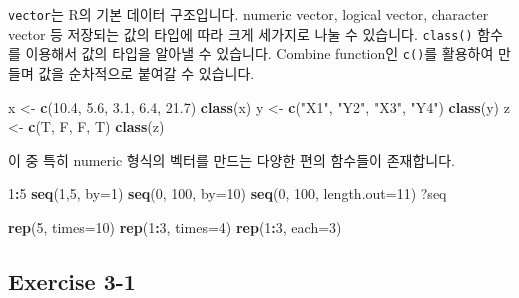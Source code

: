\documentclass[
]{book}
\newenvironment{Shaded}{\begin{snugshade}}{\end{snugshade}}
\newcommand{\DataTypeTok}[1]{\textcolor[rgb]{0.13,0.29,0.53}{#1}}
\newcommand{\DecValTok}[1]{\textcolor[rgb]{0.00,0.00,0.81}{#1}}
\newcommand{\FloatTok}[1]{\textcolor[rgb]{0.00,0.00,0.81}{#1}}
\newcommand{\KeywordTok}[1]{\textcolor[rgb]{0.13,0.29,0.53}{\textbf{#1}}}
\newcommand{\NormalTok}[1]{#1}
\newcommand{\OperatorTok}[1]{\textcolor[rgb]{0.81,0.36,0.00}{\textbf{#1}}}
\newcommand{\StringTok}[1]{\textcolor[rgb]{0.31,0.60,0.02}{#1}}
\begin{document}
\texttt{vector}는 R의 기본 데이터 구조입니다. numeric vector, logical vector, character vector 등 저장되는 값의 타입에 따라 크게 세가지로 나눌 수 있습니다. \texttt{class()} 함수를 이용해서 값의 타입을 알아낼 수 있습니다. Combine function인 \texttt{c()}를 활용하여 만들며 값을 순차적으로 붙여갈 수 있습니다.

\begin{Shaded}
\begin{Highlighting}[]
\NormalTok{x <{-}}\StringTok{ }\KeywordTok{c}\NormalTok{(}\FloatTok{10.4}\NormalTok{, }\FloatTok{5.6}\NormalTok{, }\FloatTok{3.1}\NormalTok{, }\FloatTok{6.4}\NormalTok{, }\FloatTok{21.7}\NormalTok{) }
\KeywordTok{class}\NormalTok{(x)}
\NormalTok{y <{-}}\StringTok{ }\KeywordTok{c}\NormalTok{(}\StringTok{"X1"}\NormalTok{, }\StringTok{"Y2"}\NormalTok{,  }\StringTok{"X3"}\NormalTok{,  }\StringTok{"Y4"}\NormalTok{)}
\KeywordTok{class}\NormalTok{(y)}
\NormalTok{z <{-}}\StringTok{ }\KeywordTok{c}\NormalTok{(T, F, F, T)}
\KeywordTok{class}\NormalTok{(z)}
\end{Highlighting}
\end{Shaded}

이 중 특히 numeric 형식의 벡터를 만드는 다양한 편의 함수들이 존재합니다.

\begin{Shaded}
\begin{Highlighting}[]
\DecValTok{1}\OperatorTok{:}\DecValTok{5}
\KeywordTok{seq}\NormalTok{(}\DecValTok{1}\NormalTok{,}\DecValTok{5}\NormalTok{, }\DataTypeTok{by=}\DecValTok{1}\NormalTok{)}
\KeywordTok{seq}\NormalTok{(}\DecValTok{0}\NormalTok{, }\DecValTok{100}\NormalTok{, }\DataTypeTok{by=}\DecValTok{10}\NormalTok{)}
\KeywordTok{seq}\NormalTok{(}\DecValTok{0}\NormalTok{, }\DecValTok{100}\NormalTok{, }\DataTypeTok{length.out=}\DecValTok{11}\NormalTok{)}
\NormalTok{?seq}

\KeywordTok{rep}\NormalTok{(}\DecValTok{5}\NormalTok{, }\DataTypeTok{times=}\DecValTok{10}\NormalTok{)}
\KeywordTok{rep}\NormalTok{(}\DecValTok{1}\OperatorTok{:}\DecValTok{3}\NormalTok{, }\DataTypeTok{times=}\DecValTok{4}\NormalTok{)}
\KeywordTok{rep}\NormalTok{(}\DecValTok{1}\OperatorTok{:}\DecValTok{3}\NormalTok{, }\DataTypeTok{each=}\DecValTok{3}\NormalTok{)}
\end{Highlighting}
\end{Shaded}

\hypertarget{exercise-3-1}{%
\subsection{Exercise 3-1}\label{exercise-3-1}}
\end{document}
